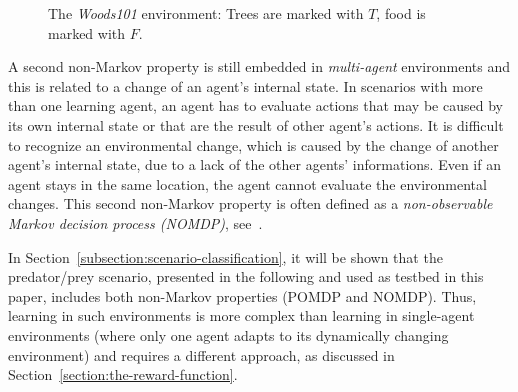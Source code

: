 \begin{figure}[ht]
  \hfill
  \hfill
  \caption{The \emph{Woods101} environment: Trees are marked with $T$, food is marked with $F$.}
  \label{figure:woods101}
\end{figure}

A second non-Markov property is still embedded in \emph{multi-agent} environments and this is related to a change of an agent's internal state. In scenarios with more than one learning agent, an agent has to evaluate actions that may be caused by its own internal state or that are the result of other agent's actions. It is difficult to recognize an environmental change, which is caused by the change of another agent's internal state, due to a lack of the other agents' informations. Even if an agent stays in the same location, the agent cannot evaluate the environmental changes. This second non-Markov property is often defined as a \emph{non-observable Markov decision process (NOMDP)}, see~\cite{TTS01}.

In Section~\ref{subsection:scenario-classification}, it will be shown that the predator/prey scenario, presented in the following and used as testbed in this paper, includes both non-Markov properties (POMDP and NOMDP). Thus, learning in such environments is more complex than learning in single-agent environments (where only one agent adapts to its dynamically changing environment) and requires a different approach, as discussed in Section~\ref{section:the-reward-function}.
